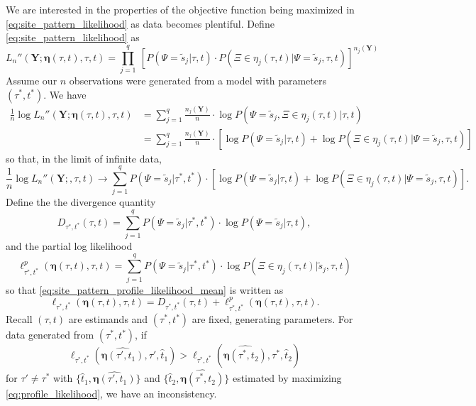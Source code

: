 \documentclass[a4paper]{article}
\newcommand{\fullAlignment}{\mathbf{Y}}
\newcommand{\siteSplit}{\tilde{s}}
\newcommand{\ancestralSplitPartition}{\eta}
\newcommand{\fullAncestralSplitPartitions}{\boldsymbol\eta}
\newcommand{\siteSplitRV}{\Psi}
\newcommand{\ancestralSplitRV}{\Xi}
\newcommand{\nCols}{n}
\newcommand{\nSiteSplits}{q}
\newcommand{\shannonDivergence}{D}
\begin{document}
We are interested in the properties of the objective function being maximized in \eqref{eq:site_pattern_likelihood} as data becomes plentiful.
Define \eqref{eq:site_pattern_likelihood} as
$$
L_\nCols''(\fullAlignment;\fullAncestralSplitPartitions(\tau, t),\tau,t) = \prod_{j=1}^{\nSiteSplits} \ \left[P(\siteSplitRV=\siteSplit_j | \tau, t) \cdot P(\ancestralSplitRV\in\ancestralSplitPartition_j(\tau, t) | \siteSplitRV=\siteSplit_j, \tau, t)\right] ^{\nCols_j(\fullAlignment)} \label{eq:site_pattern_likelihood}
$$
Assume our $\nCols$ observations were generated from a model with parameters $(\tau^*, t^*)$.
We have
\begin{align}
    \frac{1}{\nCols} \log L_\nCols''(\fullAlignment;\fullAncestralSplitPartitions(\tau,t),\tau,t)
        &= \sum_{j=1}^\nSiteSplits \frac{\nCols_j(\fullAlignment)}{\nCols}\cdot  \log P(\siteSplitRV=\siteSplit_j, \ancestralSplitRV\in\ancestralSplitPartition_j(\tau, t) | \tau, t) \\
        &= \sum_{j=1}^\nSiteSplits \frac{\nCols_j(\fullAlignment)}{\nCols}\cdot [\log P(\siteSplitRV=\siteSplit_j | \tau, t) +
            \log P(\ancestralSplitRV\in\ancestralSplitPartition_j(\tau, t) | \siteSplitRV=\siteSplit_j , \tau, t)]
\end{align}
so that, in the limit of infinite data,
\begin{equation}
\frac{1}{\nCols} \log L_\nCols''(\fullAlignment;,\tau,t) \rightarrow \sum_{j=1}^\nSiteSplits P(\siteSplitRV=\siteSplit_j | \tau^*, t^*) \cdot [\log P(\siteSplitRV=\siteSplit_j | \tau, t) + \log P(\ancestralSplitRV\in\ancestralSplitPartition_j(\tau, t) | \siteSplitRV=\siteSplit_j , \tau, t)]. \label{eq:site_pattern_profile_likelihood_mean}
\end{equation}
Define the the divergence quantity
$$
\shannonDivergence_{\tau^*,t^*}(\tau,t) = \sum_{j=1}^\nSiteSplits P(\siteSplitRV=\siteSplit_j | \tau^*, t^*)\cdot\log P(\siteSplitRV=\siteSplit_j | \tau, t),
$$
and the partial log likelihood
$$
\ell^p_{\tau^*,t^*}(\fullAncestralSplitPartitions(\tau,t),\tau,t) = \sum_{j=1}^\nSiteSplits P(\siteSplitRV=\siteSplit_j | \tau^*, t^*)\cdot\log P(\ancestralSplitRV\in\ancestralSplitPartition_j(\tau, t) | \siteSplit_j, \tau, t)
$$
so that \eqref{eq:site_pattern_profile_likelihood_mean} is written as
\begin{equation}
    \label{eq:log_likelihood_simplified}
    \ell_{\tau^*,t^*}(\fullAncestralSplitPartitions(\tau,t),\tau,t) = \shannonDivergence_{\tau^*,t^*}(\tau,t) + \ell^p_{\tau^*,t^*}(\fullAncestralSplitPartitions(\tau,t),\tau,t).
\end{equation}
Recall $(\tau, t)$ are estimands and $(\tau^*, t^*)$ are fixed, generating parameters.
For data generated from $(\tau^*, t^*)$, if
\begin{equation}
\label{eq:inconsistency_inequality}
\ell_{\tau^*,t^*}(\widehat{\fullAncestralSplitPartitions(\tau',t_1)},\tau',\hat{t}_1) > \ell_{\tau^*,t^*}(\widehat{\fullAncestralSplitPartitions(\tau^*,t_2)},\tau^*,\hat{t}_2)
\end{equation}
for $\tau'\neq\tau^*$ with $\{\hat{t}_1,\widehat{\fullAncestralSplitPartitions(\tau',t_1)}\}$ and $\{\hat{t}_2,\widehat{\fullAncestralSplitPartitions(\tau^*,t_2)}\}$ estimated by maximizing \eqref{eq:profile_likelihood}, we have an inconsistency.
\end{document}
